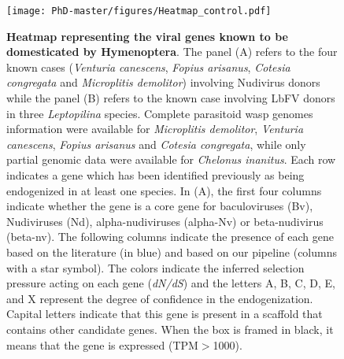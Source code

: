\begin{figure}[!ht]
 \centering
  \texttt{[image: PhD-master/figures/Heatmap\_control.pdf]}
\caption[Paper1:Distribution of domesticated EVEs in the literature used as control]{\textbf{Heatmap representing the viral genes known to be domesticated by Hymenoptera}. 
The panel (A) refers to the four known cases (\textit{Venturia canescens}, \textit{Fopius arisanus}, \textit{Cotesia congregata} and \textit{Microplitis demolitor}) involving Nudivirus donors while the panel (B) refers to the known case involving LbFV donors in three \textit{Leptopilina} species. Complete parasitoid wasp genomes information were available for \textit{Microplitis demolitor}, \textit{Venturia canescens}, \textit{Fopius arisanus} and \textit{Cotesia congregata}, while only partial genomic data were available for \textit{Chelonus inanitus}. Each row indicates a gene which has been identified previously as being endogenized in at least one species. In (A), the first four columns indicate whether the gene is a core gene for baculoviruses (Bv), Nudiviruses (Nd), alpha-nudiviruses (alpha-Nv) or beta-nudivirus (beta-nv). The following columns indicate the presence of each gene based on the literature (in blue) and based on our pipeline (columns with a star symbol). The colors indicate the inferred selection pressure acting on each gene (\textit{dN/dS}) and the letters A, B, C, D, E, and X represent the degree of confidence in the endogenization. Capital letters indicate that this gene is present in a scaffold that contains other candidate genes. When the box is framed in black, it means that the gene is expressed (TPM$>$1000).}
\label{figure:Heatmap_control}

\end{figure}

